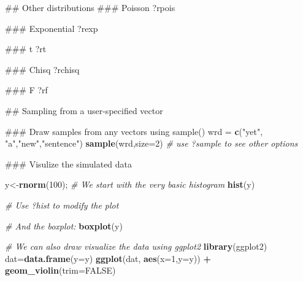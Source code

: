 \documentclass[12pt,]{book}
\newenvironment{Shaded}{\begin{snugshade}}{\end{snugshade}}
\newcommand{\KeywordTok}[1]{\textcolor[rgb]{0.13,0.29,0.53}{\textbf{#1}}}
\newcommand{\DataTypeTok}[1]{\textcolor[rgb]{0.13,0.29,0.53}{#1}}
\newcommand{\DecValTok}[1]{\textcolor[rgb]{0.00,0.00,0.81}{#1}}
\newcommand{\StringTok}[1]{\textcolor[rgb]{0.31,0.60,0.02}{#1}}
\newcommand{\CommentTok}[1]{\textcolor[rgb]{0.56,0.35,0.01}{\textit{#1}}}
\newcommand{\OtherTok}[1]{\textcolor[rgb]{0.56,0.35,0.01}{#1}}
\newcommand{\OperatorTok}[1]{\textcolor[rgb]{0.81,0.36,0.00}{\textbf{#1}}}
\newcommand{\NormalTok}[1]{#1}
\begin{document}
\begin{Shaded}
\begin{Highlighting}[]
\NormalTok{## Other distributions}
\NormalTok{### Poisson  ?rpois}

\NormalTok{### Exponential ?rexp}

\NormalTok{### t ?rt}


\NormalTok{### Chisq ?rchisq}


\NormalTok{### F ?rf}
\end{Highlighting}
\end{Shaded}

\begin{Shaded}
\begin{Highlighting}[]
\NormalTok{## Sampling from a user-specified vector }

\NormalTok{### Draw samples from any vectors using sample()}
\NormalTok{wrd =}\StringTok{ }\KeywordTok{c}\NormalTok{(}\StringTok{"yet"}\NormalTok{, }\StringTok{"a"}\NormalTok{,}\StringTok{"new"}\NormalTok{,}\StringTok{"sentence"}\NormalTok{)}
\KeywordTok{sample}\NormalTok{(wrd,}\DataTypeTok{size=}\DecValTok{2}\NormalTok{)}
\CommentTok{# use ?sample to see other options}
\end{Highlighting}
\end{Shaded}

\begin{Shaded}
\begin{Highlighting}[]
\NormalTok{### Visulize the simulated data}

\NormalTok{y<-}\KeywordTok{rnorm}\NormalTok{(}\DecValTok{100}\NormalTok{);}
\CommentTok{# We start with the very basic histogram }
\KeywordTok{hist}\NormalTok{(y)}
\end{Highlighting}
\end{Shaded}

\begin{Shaded}
\begin{Highlighting}[]
\CommentTok{# Use ?hist to modify the plot }

\CommentTok{# And the boxplot:}
\KeywordTok{boxplot}\NormalTok{(y)}
\end{Highlighting}
\end{Shaded}

\begin{Shaded}
\begin{Highlighting}[]
\CommentTok{# We can also draw visualize the data using ggplot2}
\KeywordTok{library}\NormalTok{(ggplot2)}
\NormalTok{dat=}\KeywordTok{data.frame}\NormalTok{(}\DataTypeTok{y=}\NormalTok{y)}
\KeywordTok{ggplot}\NormalTok{(dat, }\KeywordTok{aes}\NormalTok{(}\DataTypeTok{x=}\DecValTok{1}\NormalTok{,}\DataTypeTok{y=}\NormalTok{y)) }\OperatorTok{+}\StringTok{ }
\StringTok{  }\KeywordTok{geom_violin}\NormalTok{(}\DataTypeTok{trim=}\OtherTok{FALSE}\NormalTok{)}
\end{Highlighting}
\end{Shaded}
\end{document}
